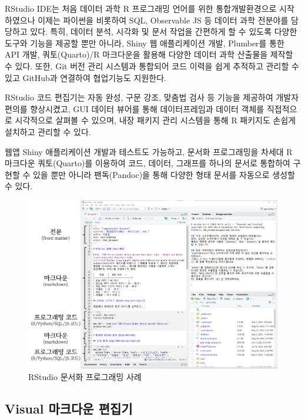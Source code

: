 \documentclass[
  letterpaper,
]{book}
\begin{document}
RStudio IDE는 처음 데이터 과학 R 프로그래밍 언어를 위한 통합개발환경으로
시작하였으나 이제는 파이썬을 비롯하여 SQL, Observable JS 등 데이터 과학
전분야를 담당하고 있다. 특히, 데이터 분석, 시각화 및 문서 작업을
간편하게 할 수 있도록 다양한 도구와 기능을 제공할 뿐만 아니라, Shiny 웹
애플리케이션 개발, Plumber를 통한 API 개발, 쿼토(Quarto)/R 마크다운을
활용해 다양한 데이터 과학 산출물을 제작할 수 있다. 또한, Git 버전 관리
시스템과 통합되어 코드 이력을 쉽게 추적하고 관리할 수 있고 GitHub과
연결하여 협업기능도 지원한다.

RStudio 코드 편집기는 자동 완성, 구문 강조, 맞춤법 검사 등 기능을
제공하여 개발자 편의를 향상시켰고, GUI 데이터 뷰어를 통해 데이터프레임과
데이터 객체를 직접적으로 시각적으로 살펴볼 수 있으며, 내장 패키지 관리
시스템을 통해 R 패키지도 손쉽게 설치하고 관리할 수 있다.

웹앱 Shiny 애플리케이션 개발과 테스트도 가능하고, 문서화 프로그래밍을
차세대 R 마크다운 쿼토(Quarto)를 이용하여 코드, 데이터, 그래프를 하나의
문서로 통합하여 구현할 수 있을 뿐만 아니라 팬독(Pandoc)을 통해 다양한
형태 문서를 자동으로 생성할 수 있다.

\begin{figure}

{\centering \includegraphics[width=7.94792in,height=\textheight]{images/rstudio-screenshot.png}

}

\caption{RStudio 문서화 프로그래밍 사례}

\end{figure}

\hypertarget{visual-markdown-main-features}{%
\subsection{Visual 마크다운
편집기}\label{visual-markdown-main-features}}
\end{document}

